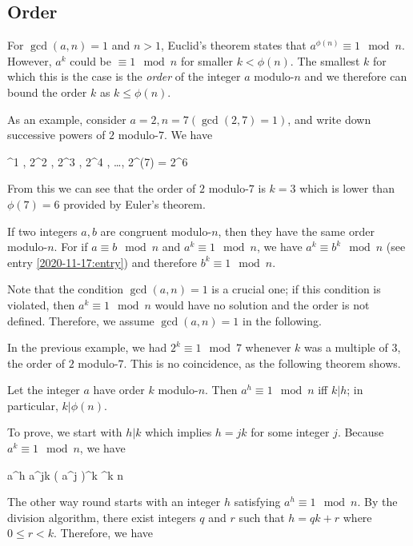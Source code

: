 
\subsection{Order}

For $\gcd(a,n)=1$ and $n > 1$, Euclid's theorem states that $a^{\phi(n)} \equiv 1 \mod n$. However, $a^k$ could be $\equiv 1 \mod n$ for smaller $k < \phi(n)$. The smallest $k$ for which this is the case is the \emph{order} of the integer $a$ modulo-$n$ and we therefore can bound the order $k$ as $k \leq \phi(n)$.

As an example, consider $a = 2, n = 7 (\gcd(2,7)=1)$, and write down successive powers of $2$ modulo-$7$. We have

^1  , 2^2  , 2^3  , 2^4  , \ldots, 2^{\phi(7)} = 2^6  
\eee

From this we can see that the order of $2$ modulo-$7$ is $k=3$ which is lower than $\phi(7) = 6$ provided by Euler's theorem.

If two integers $a, b$ are congruent modulo-$n$, then they have the same order modulo-$n$. For if $a \equiv b \mod n$ and $a^k \equiv 1 \mod n$, we have $a^k \equiv b^k \mod n$ (see entry \ref{2020-11-17:entry}) and therefore $b^k \equiv 1 \mod n$.

Note that the condition $\gcd(a,n)=1$ is a crucial one; if this condition is violated, then $a^k \equiv 1 \mod n$ would have no solution and the order is not defined. Therefore, we assume $\gcd(a,n)=1$ in the following.

In the previous example, we had $2^k \equiv 1 \mod 7$ whenever $k$ was a multiple of $3$, the order of $2$ modulo-$7$. This is no coincidence, as the following theorem shows.

\begin{theorem}
  Let the integer $a$ have order $k$ modulo-$n$. Then $a^h \equiv 1 \mod n$ iff $k | h$; in particular, $k | \phi(n)$.
\end{theorem}

To prove, we start with $h | k$ which implies $h = jk$ for some integer $j$. Because $a^k \equiv 1 \mod n$, we have

\bee
a^h \equiv a^{jk} \equiv \left( a^j \right)^k ^k  \mod n
\eee

The other way round starts with an integer $h$ satisfying $a^h \equiv 1 \mod n$. By the division algorithm, there exist integers $q$ and $r$ such that $h = qk+r$ where $0 \leq r < k$. Therefore, we have

